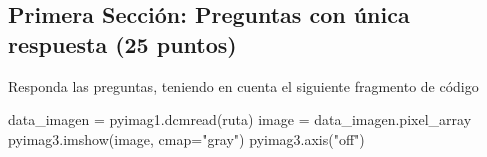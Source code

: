 \documentclass[12pt,a4paper]{article}
\newenvironment{Shaded}{\begin{snugshade}}{\end{snugshade}}
\newcommand{\NormalTok}[1]{\textcolor[rgb]{0.00,0.23,0.31}{#1}}
\newcommand{\OperatorTok}[1]{\textcolor[rgb]{0.37,0.37,0.37}{#1}}
\newcommand{\StringTok}[1]{\textcolor[rgb]{0.13,0.47,0.30}{#1}}
\begin{document}
\setcounter{page}{2} %
\subsection{Primera Sección: Preguntas con única respuesta (25
puntos)}\label{primera-secciuxf3n-preguntas-con-uxfanica-respuesta-25-puntos}

Responda las preguntas, teniendo en cuenta el siguiente fragmento de
código

\label{primera-secciuxf3n}
\begin{Shaded}
\begin{Highlighting}[]
\NormalTok{data\_imagen }\OperatorTok{=}\NormalTok{ pyimag1.dcmread(ruta)}
\NormalTok{image }\OperatorTok{=}\NormalTok{ data\_imagen.pixel\_array}
\NormalTok{pyimag3.imshow(image, cmap}\OperatorTok{=}\StringTok{"gray"}\NormalTok{)}
\NormalTok{pyimag3.axis(}\StringTok{"off"}\NormalTok{)}
\end{Highlighting}
\end{Shaded}
\end{document}
